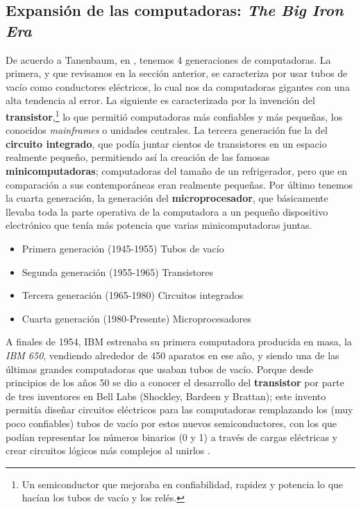\documentclass[letterpaper,12pt,oneside]{book}
\begin{document}
  
       
		
		
		
		\subsection{Expansión de las computadoras: \textit{The Big Iron Era}}
		
		
		De acuerdo a Tanenbaum, en \cite{tanenbaum_modern_2002}, tenemos 4 generaciones de computadoras. La primera, y que revisamos en la sección anterior, se caracteriza
		por usar tubos de vacío como conductores eléctricos, lo cual nos da computadoras gigantes con una alta tendencia al error. La siguiente es caracterizada
		por la invención del \textbf{transistor},\footnote{Un semiconductor que mejoraba en confiabilidad, rapidez y potencia lo que hacían los tubos de vacío y los relés.} lo que permitió computadoras más confiables y más pequeñas, los conocidos \textit{mainframes} o unidades centrales. La
		tercera generación fue la del \textbf{circuito integrado}, que podía juntar cientos de transistores en un espacio realmente pequeño, permitiendo así
		la creación de las famosas \textbf{minicomputadoras}; computadoras del tamaño de un refrigerador, pero que en comparación a sus contemporáneas eran realmente
		pequeñas. Por último tenemos la cuarta generación, la generación del \textbf{microprocesador}, que básicamente llevaba toda la parte operativa de la computadora
		a un pequeño dispositivo electrónico que tenía más potencia que varias minicomputadoras juntas.
		
		\begin{itemize}
			\item Primera generación (1945-1955) Tubos de vacío
			\item Segunda generación (1955-1965) Transistores
			\item Tercera generación (1965-1980) Circuitos integrados
			\item Cuarta generación (1980-Presente) Microprocesadores
		\end{itemize}
	
		
		
		A finales de 1954, IBM estrenaba su primera computadora producida en masa, la \textit{IBM 650}, vendiendo alrededor de 450 aparatos en ese año, y siendo una
		de las últimas grandes computadoras que usaban tubos de vacío. Porque desde principios de los años 50 se dio a conocer el desarrollo del \textbf{transistor}
		por parte de tres inventores en Bell Labs (Shockley, Bardeen y Brattan); este invento permitía  diseñar circuitos eléctricos para las
		computadoras remplazando los (muy poco confiables) tubos de vacío por estos nuevos semiconductores, con los que podían representar los números binarios (0 y 1)
		  a través de cargas eléctricas y crear circuitos lógicos más complejos al unirlos \cite{tanenbaum_modern_2002}.
    
\end{document}

